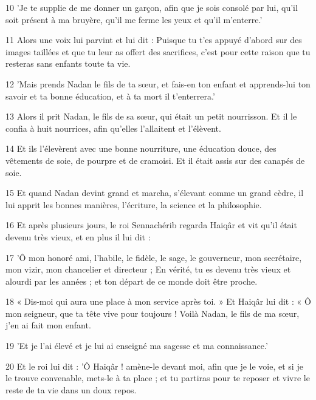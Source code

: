 \par 10 'Je te supplie de me donner un garçon, afin que je sois consolé par lui, qu'il soit présent à ma bruyère, qu'il me ferme les yeux et qu'il m'enterre.'

\par 11 Alors une voix lui parvint et lui dit : Puisque tu t'es appuyé d'abord sur des images taillées et que tu leur as offert des sacrifices, c'est pour cette raison que tu resteras sans enfants toute ta vie.

\par 12 'Mais prends Nadan le fils de ta sœur, et fais-en ton enfant et apprends-lui ton savoir et ta bonne éducation, et à ta mort il t'enterrera.'

\par 13 Alors il prit Nadan, le fils de sa sœur, qui était un petit nourrisson. Et il le confia à huit nourrices, afin qu'elles l'allaitent et l'élèvent.

\par 14 Et ils l'élevèrent avec une bonne nourriture, une éducation douce, des vêtements de soie, de pourpre et de cramoisi. Et il était assis sur des canapés de soie.

\par 15 Et quand Nadan devint grand et marcha, s'élevant comme un grand cèdre, il lui apprit les bonnes manières, l'écriture, la science et la philosophie.

\par 16 Et après plusieurs jours, le roi Sennachérib regarda Haiqâr et vit qu'il était devenu très vieux, et en plus il lui dit :

\par 17 'Ô mon honoré ami, l'habile, le fidèle, le sage, le gouverneur, mon secrétaire, mon vizir, mon chancelier et directeur ; En vérité, tu es devenu très vieux et alourdi par les années ; et ton départ de ce monde doit être proche.

\par 18 « Dis-moi qui aura une place à mon service après toi. » Et Haiqâr lui dit : « Ô mon seigneur, que ta tête vive pour toujours ! Voilà Nadan, le fils de ma sœur, j'en ai fait mon enfant.

\par 19 'Et je l'ai élevé et je lui ai enseigné ma sagesse et ma connaissance.'

\par 20 Et le roi lui dit : 'Ô Haiqâr ! amène-le devant moi, afin que je le voie, et si je le trouve convenable, mets-le à ta place ; et tu partiras pour te reposer et vivre le reste de ta vie dans un doux repos.

